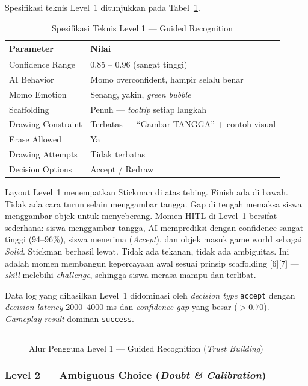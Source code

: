 \documentclass[12pt,oneside]{report}
\begin{document}
Spesifikasi teknis Level~1 ditunjukkan pada Tabel~\ref{tab:level1-spec}.

\begin{table}[H]
\centering
\caption{Spesifikasi Teknis Level 1 --- Guided Recognition}
\label{tab:level1-spec}
\begin{tabular}{|l|l|}
\hline
\textbf{Parameter} & \textbf{Nilai} \\ \hline
Confidence Range & 0.85 -- 0.96 (sangat tinggi) \\ \hline
AI Behavior & Momo overconfident, hampir selalu benar \\ \hline
Momo Emotion & Senang, yakin, \textit{green bubble} \\ \hline
Scaffolding & Penuh --- \textit{tooltip} setiap langkah \\ \hline
Drawing Constraint & Terbatas --- ``Gambar TANGGA'' + contoh visual \\ \hline
Erase Allowed & Ya \\ \hline
Drawing Attempts & Tidak terbatas \\ \hline
Decision Options & Accept / Redraw \\ \hline
\end{tabular}
\end{table}

Layout Level~1 menempatkan Stickman di atas tebing. Finish ada di bawah. Tidak ada cara turun selain menggambar tangga. Gap di tengah memaksa siswa menggambar objek untuk menyeberang. Momen HITL di Level~1 bersifat sederhana: siswa menggambar tangga, AI memprediksi dengan confidence sangat tinggi (94--96\%), siswa menerima (\textit{Accept}), dan objek masuk game world sebagai \textit{Solid}. Stickman berhasil lewat. Tidak ada tekanan, tidak ada ambiguitas. Ini adalah momen membangun kepercayaan awal sesuai prinsip scaffolding [6][7] --- \textit{skill} melebihi \textit{challenge}, sehingga siswa merasa mampu dan terlibat.

Data log yang dihasilkan Level~1 didominasi oleh \textit{decision type} \texttt{accept} dengan \textit{decision latency} 2000--4000 ms dan \textit{confidence gap} yang besar ($>0.70$). \textit{Gameplay result} dominan \texttt{success}.

\begin{figure}[H]
    \centering
    \rule{0.9\textwidth}{6cm}
    \caption{Alur Pengguna Level 1 --- Guided Recognition (\textit{Trust Building})}
    \label{fig:level1-flow}
\end{figure}

\subsubsection{Level 2 --- Ambiguous Choice (\textit{Doubt \& Calibration})}
\end{document}

